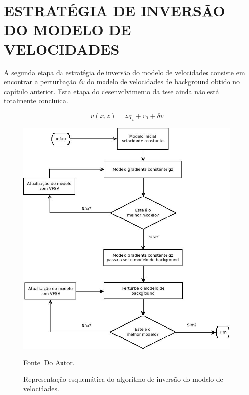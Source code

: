 \chapter{ESTRATÉGIA DE INVERSÃO DO MODELO DE VELOCIDADES}
\label{cap5}

A segunda etapa da estratégia de inversão do modelo de velocidades consiste em encontrar a perturbação
$\delta v$ do modelo de velocidades de background obtido no capítulo anterior.
Esta etapa do desenvolvimento da tese ainda não está totalmente concluída.

\begin{equation}
\label{eq:5.1}
v(x,z)=z g_z+v_0+\delta v
\end{equation}

\begin{figure}[H]
\caption{Representação esquemática do algoritmo de inversão do modelo de velocidades.}
\begin{center}
\includegraphics[scale=0.5]{images/fluxonovoVel.jpeg}
\vspace{-0.3cm}
\end{center}
\begin{center}
 Fonte: Do Autor.
\end{center}
\label{fig:5.1}
\end{figure}

